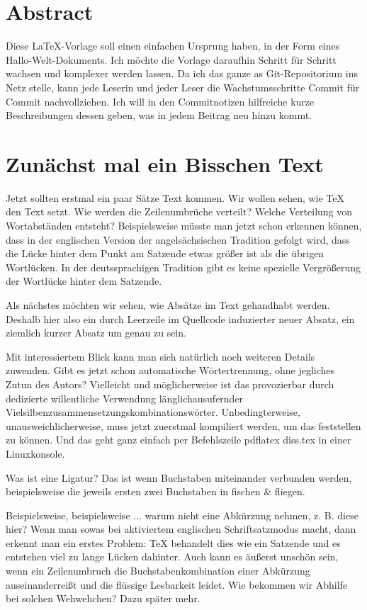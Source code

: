 \documentclass[11pt,a4paper,twoside,titlepage]{book}
\begin{document}
\frontmatter
\chapter{Abstract}%
Diese LaTeX-Vorlage soll einen einfachen Ursprung haben, in der Form eines Hallo-Welt-Dokuments. Ich möchte die Vorlage daraufhin Schritt für Schritt wachsen und komplexer werden lassen. Da ich das ganze as Git-Repositorium ins Netz stelle, kann jede Leserin und jeder Leser die Wachstumsschritte Commit für Commit nachvollziehen. Ich will in den Commitnotizen hilfreiche kurze Beschreibungen dessen geben, was in jedem Beitrag neu hinzu kommt.

\tableofcontents
\cleardoublepage


\mainmatter
\chapter{Zunächst mal ein Bisschen Text}%
Jetzt sollten erstmal ein paar Sätze Text kommen. Wir wollen sehen, wie TeX den Text setzt. Wie werden die Zeilenumbrüche verteilt? Welche Verteilung von Wortabständen entsteht? Beispielsweise müsste man jetzt schon erkennen können, dass in der englischen Version der angelsächsischen Tradition gefolgt wird, dass die Lücke hinter dem Punkt am Satzende etwas größer ist als die übrigen Wortlücken. In der deutssprachigen Tradition gibt es keine spezielle Vergrößerung der Wortlücke hinter dem Satzende.

Als nächstes möchten wir sehen, wie Absätze im Text gehandhabt werden. Deshalb hier also ein durch Leerzeile im Quellcode induzierter neuer Absatz, ein ziemlich kurzer Absatz um genau zu sein.

Mit interessiertem Blick kann man sich natürlich noch weiteren Details zuwenden. Gibt es jetzt schon automatische Wörtertrennung, ohne jegliches Zutun des Autors? Vielleicht und möglicherweise ist das provozierbar durch dedizierte willentliche Verwendung länglichausufernder Vielsilbenzusammensetzungskombinationswörter. Unbedingterweise, unausweichlicherweise, muss jetzt zuerstmal kompiliert werden, um das feststellen zu können. Und das geht ganz einfach per Befehlszeile \glqq pdflatex diss.tex\grqq{} in einer Linuxkonsole.

Was ist eine Ligatur? Das ist wenn Buchstaben miteinander verbunden werden, beispielsweise die jeweils ersten zwei Buchstaben in \glqq fischen\grqq{} \& \glqq fliegen\grqq{}.

Beispielsweise, beispielsweise ... warum nicht eine Abkürzung nehmen, z. B. diese hier? Wenn man sowas bei aktiviertem englischen Schriftsatzmodus macht, dann erkennt man ein erstes Problem: TeX behandelt dies wie ein Satzende und es entstehen viel zu lange Lücken dahinter. Auch kann es äußerst unschön sein, wenn ein Zeilenumbruch die Buchstabenkombination einer Abkürzung auseinanderreißt und die flüssige Lesbarkeit leidet. Wie bekommen wir Abhilfe bei solchen Wehwehchen? Dazu später mehr.
\end{document}
